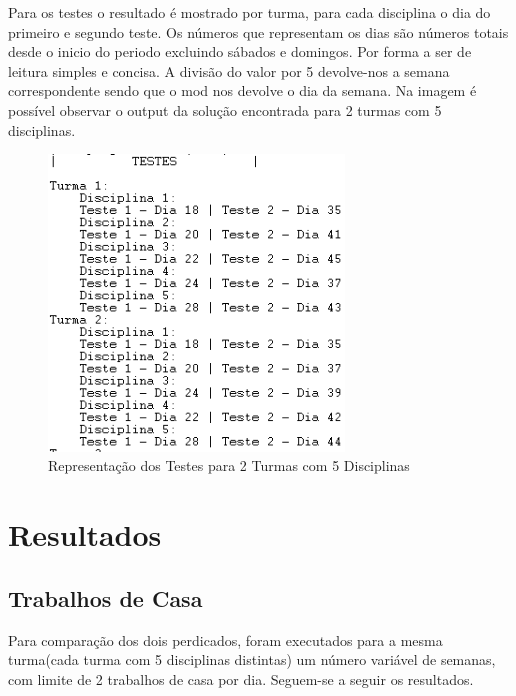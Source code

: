\documentclass{llncs}
\begin{document}
Para os testes o resultado é mostrado por turma, para cada disciplina o dia do primeiro e segundo teste. Os números que representam os dias são números totais desde o inicio do periodo excluindo sábados e domingos. Por forma a ser de leitura simples e concisa. A divisão do valor por 5 devolve-nos a semana correspondente sendo que o mod nos devolve o  dia da semana.
Na imagem é possível observar o output da solução encontrada para 2 turmas com 5 disciplinas.
\begin{figure}
\centering
\includegraphics[width=0.7\textwidth]{testes}
\caption{Representação dos Testes para 2 Turmas com 5 Disciplinas}
\end{figure}
\FloatBarrier

\section{Resultados}

\subsection{ Trabalhos de Casa}

Para comparação dos dois perdicados, foram executados para a mesma turma(cada turma com 5 disciplinas distintas) um número variável de semanas, com limite de 2 trabalhos de casa por dia. Seguem-se a seguir os resultados.
\end{document}
